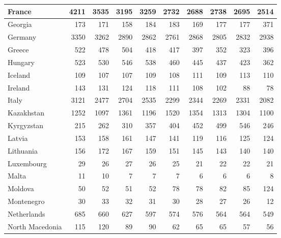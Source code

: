 \begin{table}
\begin{tabular}{|l|r|r|r|r|r|r|r|r|r|}
                        France&   4211&   3535&   3195&   3259&   2732&   2688&   2738&   2695&   2514\\\hline
                       Georgia&    173&    171&    158&    184&    183&    169&    177&    177&    371\\\hline
                       Germany&   3350&   3262&   2890&   2862&   2761&   2868&   2805&   2832&   2938\\\hline
                        Greece&    522&    478&    504&    418&    417&    397&    352&    323&    396\\\hline
                       Hungary&    523&    530&    546&    538&    460&    445&    437&    423&    362\\\hline
                       Iceland&    109&    107&    107&    109&    108&    111&    109&    113&    110\\\hline
                       Ireland&    143&    131&    124&    118&    111&    108&    102&     88&     78\\\hline
                         Italy&   3121&   2477&   2704&   2535&   2299&   2344&   2269&   2331&   2082\\\hline
                    Kazakhstan&   1252&   1097&   1361&   1196&   1520&   1354&   1313&   1304&   1100\\\hline
                    Kyrgyzstan&    215&    262&    310&    357&    404&    452&    499&    546&    246\\\hline
                        Latvia&    153&    158&    161&    147&    141&    119&    116&    125&    124\\\hline
                     Lithuania&    156&    172&    167&    159&    151&    145&    143&    140&    140\\\hline
                    Luxembourg&     29&     26&     27&     26&     25&     21&     22&     22&     21\\\hline
                         Malta&     11&     10&      7&      7&      7&      6&      6&      6&      8\\\hline
                       Moldova&     50&     52&     51&     52&     78&     78&     82&     85&    124\\\hline
                    Montenegro&     30&     33&     32&     31&     30&     28&     27&     26&     12\\\hline
                   Netherlands&    685&    660&    627&    597&    574&    576&    564&    564&    549\\\hline
               North Macedonia&    115&    120&     89&     90&     62&     65&     65&     57&     56\\\hline

\end{tabular}
\end{table}
